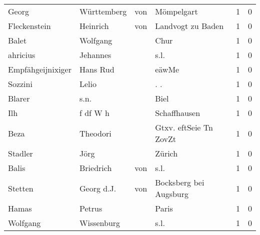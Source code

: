 \documentclass[10pt,a4paper,landscape]{article}
\begin{document}
\begin{longtable}{llllrr}
                    Georg &                        Württemberg &         von &                                  Mömpelgart &          1 &         0 \\
             Fleckenstein &                           Heinrich &         von &                           Landvogt zu Baden &          1 &         0 \\
                    Balet &                           Wolfgang &             &                                        Chur &          1 &         0 \\
                 ahricius &                           Jehannes &             &                                        s.l. &          1 &         0 \\
        Empfähgeijnixiger &                           Hans Rud &             &                                       eäwMe &          1 &         0 \\
                  Sozzini &                              Lelio &             &                                        . .  &          1 &         0 \\
                   Blarer &                               s.n. &             &                                        Biel &          1 &         0 \\
                      Ilh &                           f df W h &             &                                Schaffhausen &          1 &         0 \\
                     Beza &                           Theodori &             &                      Gtxv. eftSeie Tn ZovZt &          1 &         0 \\
                  Stadler &                               Jörg &             &                                      Zürich &          1 &         0 \\
                    Balis &                          Briedrich &         von &                                        s.l. &          1 &         0 \\
                  Stetten &                         Georg d.J. &         von &                      Bocksberg bei Augsburg &          1 &         0 \\
                    Hamas &                             Petrus &             &                                       Paris &          1 &         0 \\
                 Wolfgang &                         Wissenburg &             &                                        s.l. &          1 &         0 \\

\end{longtable}
\end{document}
